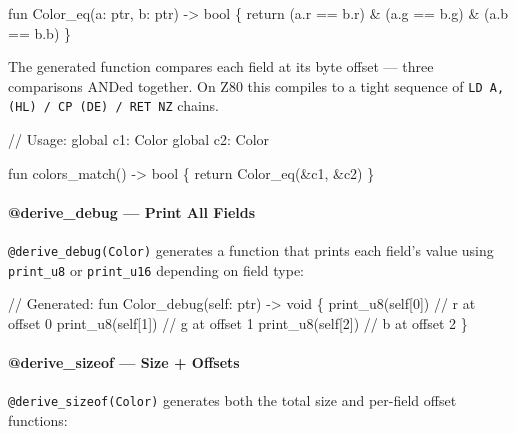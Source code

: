 \documentclass[
  11pt,
]{article}
\newenvironment{Shaded}{\begin{snugshade}}{\end{snugshade}}
\newcommand{\NormalTok}[1]{#1}
\begin{document}
\begin{Shaded}
\begin{Highlighting}[]
\NormalTok{fun Color\_eq(a: ptr, b: ptr) {-}\textgreater{} bool \{}
\NormalTok{    return (a.r == b.r) \& (a.g == b.g) \& (a.b == b.b)}
\NormalTok{\}}
\end{Highlighting}
\end{Shaded}

The generated function compares each field at its byte offset --- three
comparisons ANDed together. On Z80 this compiles to a tight sequence of
\texttt{LD\ A,(HL)\ /\ CP\ (DE)\ /\ RET\ NZ} chains.

\begin{Shaded}
\begin{Highlighting}[]
\NormalTok{// Usage:}
\NormalTok{global c1: Color}
\NormalTok{global c2: Color}

\NormalTok{fun colors\_match() {-}\textgreater{} bool \{}
\NormalTok{    return Color\_eq(\&c1, \&c2)}
\NormalTok{\}}
\end{Highlighting}
\end{Shaded}

\hypertarget{derive_debug-print-all-fields}{%
\paragraph{@derive\_debug --- Print All
Fields}\label{derive_debug-print-all-fields}}

\texttt{@derive\_debug(Color)} generates a function that prints each
field's value using \texttt{print\_u8} or \texttt{print\_u16} depending
on field type:

\begin{Shaded}
\begin{Highlighting}[]
\NormalTok{// Generated:}
\NormalTok{fun Color\_debug(self: ptr) {-}\textgreater{} void \{}
\NormalTok{    print\_u8(self[0])    // r at offset 0}
\NormalTok{    print\_u8(self[1])    // g at offset 1}
\NormalTok{    print\_u8(self[2])    // b at offset 2}
\NormalTok{\}}
\end{Highlighting}
\end{Shaded}

\hypertarget{derive_sizeof-size-offsets}{%
\paragraph{@derive\_sizeof --- Size +
Offsets}\label{derive_sizeof-size-offsets}}

\texttt{@derive\_sizeof(Color)} generates both the total size and
per-field offset functions:
\end{document}
